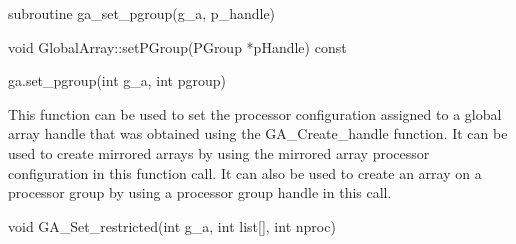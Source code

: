 \documentclass[10pt]{article}
\begin{document}
\begin{fapi}
\begin{fcode}
subroutine ga_set_pgroup(g_a, p_handle)
\end{fcode}
\begin{funcargs}
\end{funcargs}
\end{fapi}

\begin{cxxapi}
\begin{cxxcode}
void GlobalArray::setPGroup(PGroup *pHandle) const
\end{cxxcode}
\begin{funcargs}
\end{funcargs}
\end{cxxapi}

\begin{pyapi}
\begin{pycode}
ga.set_pgroup(int g_a, int pgroup)
\end{pycode}
\begin{funcargs}
\end{funcargs}
\end{pyapi}

\gcoll

\begin{desc}

This function can be used to set the processor configuration assigned to a
global array handle that was obtained using the GA_Create_handle function. It
can be used to create mirrored arrays by using the mirrored array processor
configuration in this function call. It can also be used to create an array on
a processor group by using a processor group handle in this call.

\end{desc}


\begin{capi}
\begin{ccode}
void GA_Set_restricted(int g_a, int list[], int nproc)
\end{ccode}
\begin{funcargs}
\end{funcargs}
\end{capi}
\end{document}

